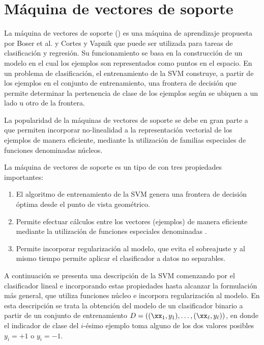 %
%
%
\section{Máquina de vectores de soporte}
%
La máquina de vectores de soporte ()
es una máquina de aprendizaje propuesta por Boser et al. \cite{boser}
y Cortes y Vapnik \cite{svm} que puede ser utilizada para tareas de
clasificación y regresión. Su funcionamiento se basa en la
construcción de un modelo en el cual los ejemplos son representados
como puntos en el espacio.
En un problema de clasificación, el entrenamiento de la SVM construye,
a partir de los ejemplos en el conjunto de entrenamiento, una frontera
de decisión que permite determinar la pertenencia de clase de los
ejemplos según se ubiquen a un lado u otro de la frontera.

La popularidad de la máquinas de vectores de soporte se debe en gran
parte a que permiten incorporar no-linealidad a la representación
vectorial de los ejemplos de manera eficiente, mediante la utilización
de familias especiales de funciones denominadas núcleos.


La máquina de vectores de soporte es un tipo de  con tres propiedades importantes:
%
\begin{enumerate}
\item El algoritmo de entrenamiento de la SVM genera una frontera de
  decisión óptima desde el punto de vista geométrico.
\item Permite efectuar cálculos entre los vectores (ejemplos) de
  manera eficiente mediante la utilización de funciones especiales
  denominadas .
\item Permite incorporar regularización al modelo, que evita el
  sobreajuste y al mismo tiempo permite aplicar el clasificador a
  datos no separables.
\end{enumerate}
%
A continuación se presenta una descripción de la SVM
comenzando por el clasificador lineal e incorporando estas propiedades
hasta alcanzar la formulación más general, que
utiliza funciones núcleo e incorpora regularización al modelo.
En esta descripción se trata la obtención del modelo de un
clasificador binario a partir de un conjunto de entrenamiento
$D=\left((\xx_1,y_1),\ldots,(\xx_\ell,y_\ell)\right)$, en donde el
indicador de clase del $i$-ésimo ejemplo toma alguno de los dos
valores posibles $y_i=+1$ o $y_i=-1$.
